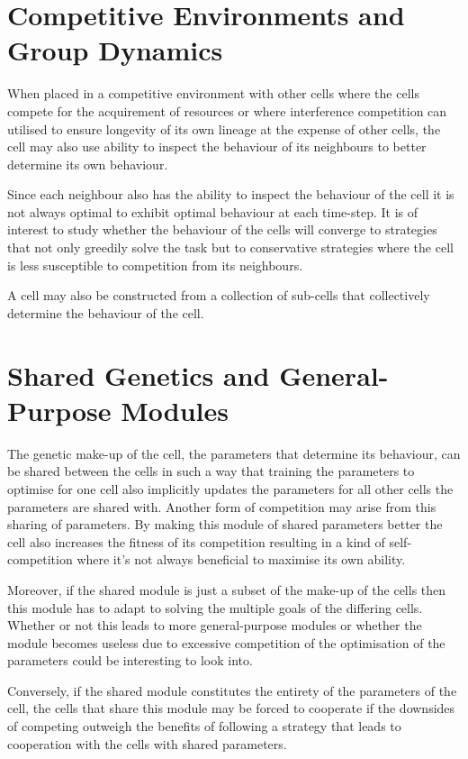 \documentclass[a4paper]{article}
\begin{document}
\section{Competitive Environments and Group Dynamics}

When placed in a competitive environment with other cells where the cells compete for the acquirement of resources or where interference competition can utilised to ensure longevity of its own lineage at the expense of other cells, the cell may also use ability to inspect the behaviour of its neighbours to better determine its own behaviour.

Since each neighbour also has the ability to inspect the behaviour of the cell it is not always optimal to exhibit optimal behaviour at each time-step.
%
It is of interest to study whether the behaviour of the cells will converge to strategies that not only greedily solve the task but to conservative strategies where the cell is less susceptible to competition from its neighbours.

A cell may also be constructed from a collection of sub-cells that collectively determine the behaviour of the cell.

\section{Shared Genetics and General-Purpose Modules}

The genetic make-up of the cell, the parameters that determine its behaviour, can be shared between the cells in such a way that training the parameters to optimise for one cell also implicitly updates the parameters for all other cells the parameters are shared with.
%
Another form of competition may arise from this sharing of parameters.
%
By making this module of shared parameters better the cell also increases the fitness of its competition resulting in a kind of self-competition where it's not always beneficial to maximise its own ability.

Moreover, if the shared module is just a subset of the make-up of the cells then this module has to adapt to solving the multiple goals of the differing cells.
%
Whether or not this leads to more general-purpose modules or whether the module becomes useless due to excessive competition of the optimisation of the parameters could be interesting to look into.

Conversely, if the shared module constitutes the entirety of the parameters of the cell, the cells that share this module may be forced to cooperate if the downsides of competing outweigh the benefits of following a strategy that leads to cooperation with the cells with shared parameters.
\end{document}
